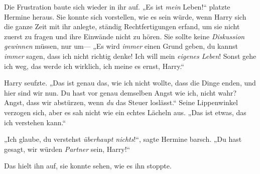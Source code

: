 Die Frustration baute sich wieder in ihr auf. „Es ist \emph{mein} Leben!“ platzte Hermine heraus. Sie konnte sich vorstellen, wie es sein würde, wenn Harry sich die ganze Zeit mit ihr anlegte, ständig Rechtfertigungen erfand, um sie nicht zuerst zu fragen und ihre Einwände nicht zu hören. Sie sollte keine \emph{Diskussion gewinnen} müssen, nur um— „Es wird \emph{immer} einen Grund geben, du kannst \emph{immer} sagen, dass ich nicht richtig denke! Ich will mein \emph{eigenes Leben}! Sonst gehe ich weg, das werde ich wirklich, ich meine es ernst, Harry.“

Harry seufzte. „Das ist genau das, wie ich nicht wollte, dass die Dinge enden, und hier sind wir nun. Du hast vor genau demselben Angst wie ich, nicht wahr? Angst, dass wir abstürzen, wenn \emph{du} das Steuer loslässt.“ Seine Lippenwinkel verzogen sich, aber es sah nicht wie ein echtes Lächeln aus. „Das ist etwas, das ich verstehen kann.“

„Ich glaube, du verstehst \emph{überhaupt nichts}!“, sagte Hermine barsch. „Du hast gesagt, wir würden \emph{Partner} sein, Harry!“

Das hielt ihn auf, sie konnte sehen, wie es ihn stoppte.

